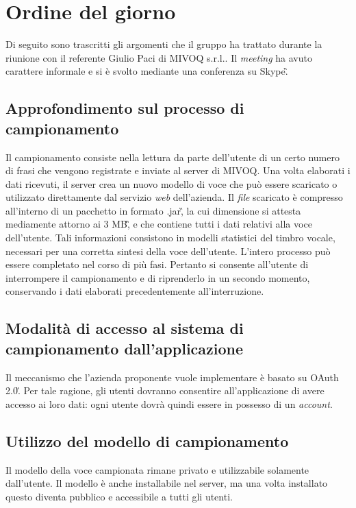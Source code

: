 \section{Ordine del giorno}
Di seguito sono trascritti gli argomenti che il gruppo ha trattato durante la 
riunione con il referente Giulio Paci di MIVOQ s.r.l.. Il \textit{meeting} ha avuto carattere 
informale e si è svolto mediante una conferenza su Skype\G .

\subsection{Approfondimento sul processo di campionamento}
Il campionamento consiste nella lettura da parte dell'utente di un certo numero 
di frasi che vengono registrate e inviate al server di MIVOQ. Una volta elaborati i dati 
ricevuti, il server crea un nuovo modello di voce che può essere scaricato o utilizzato direttamente dal servizio \textit{web} dell'azienda. 
Il \textit{file} scaricato è compresso all'interno di un pacchetto in formato .jar\G, la cui dimensione si attesta mediamente attorno ai 3 MB\G, 
e che contiene tutti i dati relativi alla voce dell'utente. Tali informazioni consistono in modelli 
statistici del timbro vocale, necessari per una corretta sintesi della voce dell'utente. 
L'intero processo può essere completato nel corso di più fasi. Pertanto si consente all'utente di interrompere il campionamento e di riprenderlo in un 
secondo momento, conservando i dati elaborati precedentemente all'interruzione.

\subsection{Modalità di accesso al sistema di campionamento dall'applicazione}
Il meccanismo che l'azienda proponente vuole implementare è basato su OAuth 2.0\G. Per tale ragione,
gli utenti dovranno consentire all'applicazione di avere accesso ai loro dati: 
ogni utente dovrà quindi essere in possesso di un \textit{account}.

\subsection{Utilizzo del modello di campionamento}
Il modello della voce campionata rimane privato e utilizzabile solamente dall'utente. 
Il modello è anche installabile nel server, ma una volta installato 
questo diventa pubblico e accessibile a tutti gli utenti.

